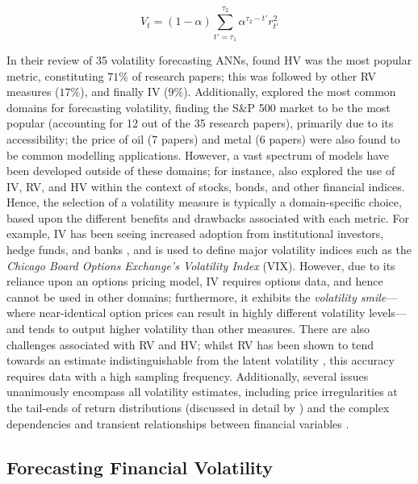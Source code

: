 \documentclass[a4paper, 11pt]{report}
\begin{document}
    \begin{equation}
        \label{eq: hv2}
        V_t = (1 - \alpha) \sum_{t' = \tau_1}^{\tau_2} \alpha^{\tau_2 - t'} r_{t'}^2
    \end{equation}

    In their review of 35 volatility forecasting ANNs, \citet{ge-2022} found HV was the most popular metric, constituting $71\%$ of research papers; this was followed by other RV measures ($17\%$), and finally IV ($9\%$). Additionally, \citet{ge-2022} explored the most common domains for forecasting volatility, finding the S\&P 500 market to be the most popular (accounting for 12 out of the 35 research papers), primarily due to its accessibility; the price of oil (7 papers) and metal (6 papers) were also found to be common modelling applications. However, a vast spectrum of models have been developed outside of these domains; for instance, \citet{ge-2022} also explored the use of IV, RV, and HV within the context of stocks, bonds, and other financial indices. Hence, the selection of a volatility measure is typically a domain-specific choice, based upon the different benefits and drawbacks associated with each metric. For example, IV has been seeing increased adoption from institutional investors, hedge funds, and banks \citep{neftci-2008}, and is used to define major volatility indices such as the \emph{Chicago Board Options Exchange's Volatility Index} (VIX). However, due to its reliance upon an options pricing model, IV requires options data, and hence cannot be used in other domains; furthermore, it exhibits the \emph{volatility smile}---where near-identical option prices can result in highly different volatility levels---and tends to output higher volatility than other measures. There are also challenges associated with RV and HV; whilst RV has been shown to tend towards an estimate indistinguishable from the latent volatility \citep{andersen-2001}, this accuracy requires data with a high sampling frequency. Additionally, several issues unanimously encompass all volatility estimates, including price irregularities at the tail-ends of return distributions (discussed in detail by \citet{ozbayoglu-2020}) and the complex dependencies and transient relationships between financial variables \citep{timmermann-2004}.


    \subsection{Forecasting Financial Volatility}
\end{document}
